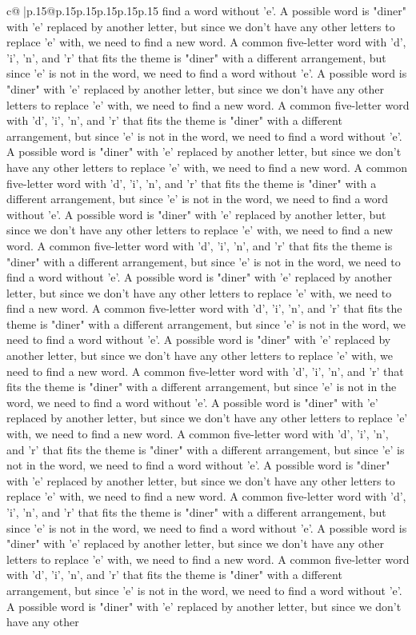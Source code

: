 \documentclass{article}
\begin{document}
{\begin{supertabular}{c@{$\;$}|p{.15\linewidth}@{}p{.15\linewidth}p{.15\linewidth}p{.15\linewidth}p{.15\linewidth}p{.15\linewidth}}
{{{find a word without 'e'. A possible word is "diner" with 'e' replaced by another letter, but since we don't have any other letters to replace 'e' with, we need to find a new word. A common five{-}letter word with 'd', 'i', 'n', and 'r' that fits the theme is "diner" with a different arrangement, but since 'e' is not in the word, we need to find a word without 'e'. A possible word is "diner" with 'e' replaced by another letter, but since we don't have any other letters to replace 'e' with, we need to find a new word. A common five{-}letter word with 'd', 'i', 'n', and 'r' that fits the theme is "diner" with a different arrangement, but since 'e' is not in the word, we need to find a word without 'e'. A possible word is "diner" with 'e' replaced by another letter, but since we don't have any other letters to replace 'e' with, we need to find a new word. A common five{-}letter word with 'd', 'i', 'n', and 'r' that fits the theme is "diner" with a different arrangement, but since 'e' is not in the word, we need to find a word without 'e'. A possible word is "diner" with 'e' replaced by another letter, but since we don't have any other letters to replace 'e' with, we need to find a new word. A common five{-}letter word with 'd', 'i', 'n', and 'r' that fits the theme is "diner" with a different arrangement, but since 'e' is not in the word, we need to find a word without 'e'. A possible word is "diner" with 'e' replaced by another letter, but since we don't have any other letters to replace 'e' with, we need to find a new word. A common five{-}letter word with 'd', 'i', 'n', and 'r' that fits the theme is "diner" with a different arrangement, but since 'e' is not in the word, we need to find a word without 'e'. A possible word is "diner" with 'e' replaced by another letter, but since we don't have any other letters to replace 'e' with, we need to find a new word. A common five{-}letter word with 'd', 'i', 'n', and 'r' that fits the theme is "diner" with a different arrangement, but since 'e' is not in the word, we need to find a word without 'e'. A possible word is "diner" with 'e' replaced by another letter, but since we don't have any other letters to replace 'e' with, we need to find a new word. A common five{-}letter word with 'd', 'i', 'n', and 'r' that fits the theme is "diner" with a different arrangement, but since 'e' is not in the word, we need to find a word without 'e'. A possible word is "diner" with 'e' replaced by another letter, but since we don't have any other letters to replace 'e' with, we need to find a new word. A common five{-}letter word with 'd', 'i', 'n', and 'r' that fits the theme is "diner" with a different arrangement, but since 'e' is not in the word, we need to find a word without 'e'. A possible word is "diner" with 'e' replaced by another letter, but since we don't have any other letters to replace 'e' with, we need to find a new word. A common five{-}letter word with 'd', 'i', 'n', and 'r' that fits the theme is "diner" with a different arrangement, but since 'e' is not in the word, we need to find a word without 'e'. A possible word is "diner" with 'e' replaced by another letter, but since we don't have any other }}}
\end{supertabular}}
\end{document}
